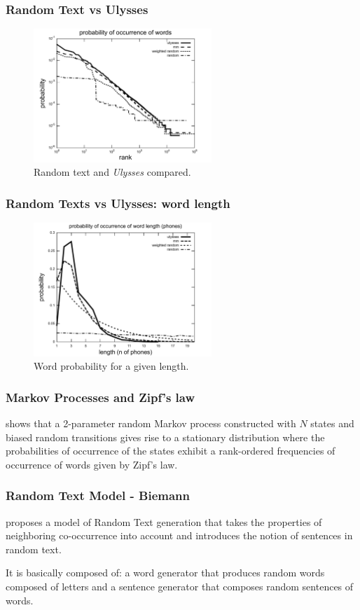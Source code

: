 \documentclass{beamer}
\begin{document}
\frame
{
  \frametitle{Random Text vs Ulysses}
    \begin{figure}[h!]
    \centering
    \includegraphics[width=0.6\textwidth]{imagespresentation/ulysses_compared_words_probabilities.pdf}
    \caption{Random text and \textit{Ulysses} compared.}
    \label{fig:ulysses_compared_words_probabilities}
    \end{figure}
}


\frame
{
  \frametitle{Random Texts vs Ulysses: word length}
    \begin{figure}[h!]
    \centering
    \includegraphics[width=0.6\textwidth]{imagespresentation/ulysses_compared_word_length_probabilities.pdf}
    \caption{Word probability for a given length.}
    \label{fig:ulysses_compared_word_length_probabilities}
    \end{figure}
}



\frame
{
  \frametitle{Markov Processes and Zipf's law}
  \cite{kanter1995} shows that a 2-parameter random Markov process constructed with $N$ states and biased
  random transitions gives rise to a stationary distribution where the probabilities of occurrence of the
  states exhibit a rank-ordered frequencies of occurrence of words given by Zipf's law.
}


\frame
{
  \frametitle{Random Text Model - Biemann}
  \cite{biemann2007} proposes a model of Random Text generation that
  takes the properties of neighboring co-occurrence into account
  and introduces the notion of sentences in random text.
 
  \vspace{0.5cm} 
  It is basically composed of: a word generator that produces random words 
  composed of letters and a sentence generator that composes random
  sentences of words.
}
\end{document}
